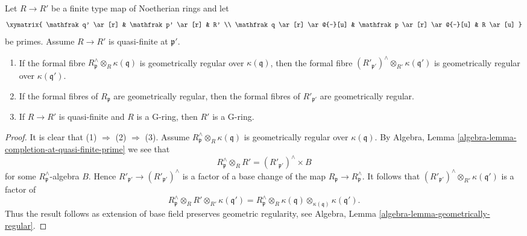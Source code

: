 \begin{lemma}
\label{lemma-G-ring-goes-up-quasi-finite}
Let $R \to R'$ be a finite type map of Noetherian rings and let
$$
\xymatrix{
\mathfrak q' \ar[r] & \mathfrak p' \ar[r] & R' \\
\mathfrak q \ar[r] \ar@{-}[u] &
\mathfrak p \ar[r] \ar@{-}[u] & R \ar[u]
}
$$
be primes. Assume $R \to R'$ is quasi-finite at $\mathfrak p'$.
\begin{enumerate}
\item If the formal fibre $R_\mathfrak p^\wedge \otimes_R \kappa(\mathfrak q)$
is geometrically regular over $\kappa(\mathfrak q)$, then the formal fibre
$(R'_{\mathfrak p'})^\wedge \otimes_{R'} \kappa(\mathfrak q')$
is geometrically regular over $\kappa(\mathfrak q')$.
\item If the formal fibres of $R_\mathfrak p$ are geometrically regular,
then the formal fibres of $R'_{\mathfrak p'}$ are geometrically regular.
\item If $R \to R'$ is quasi-finite and $R$ is a G-ring, then $R'$ is
a G-ring.
\end{enumerate}
\end{lemma}

\begin{proof}
It is clear that (1) $\Rightarrow$ (2) $\Rightarrow$ (3).
Assume $R_\mathfrak p^\wedge \otimes_R \kappa(\mathfrak q)$
is geometrically regular over $\kappa(\mathfrak q)$.
By Algebra, Lemma \ref{algebra-lemma-completion-at-quasi-finite-prime}
we see that
$$
R_\mathfrak p^\wedge \otimes_R R'
=
(R'_{\mathfrak p'})^\wedge \times B
$$
for some $R_\mathfrak p^\wedge$-algebra $B$. Hence
$R'_{\mathfrak p'} \to (R'_{\mathfrak p'})^\wedge$ is a factor of
a base change of the map $R_\mathfrak p \to R_\mathfrak p^\wedge$.
It follows that $(R'_{\mathfrak p'})^\wedge \otimes_{R'} \kappa(\mathfrak q')$
is a factor of
$$
R_\mathfrak p^\wedge \otimes_R R' \otimes_{R'} \kappa(\mathfrak q') =
R_\mathfrak p^\wedge \otimes_R \kappa(\mathfrak q)
\otimes_{\kappa(\mathfrak q)} \kappa(\mathfrak q').
$$
Thus the result follows as extension of base field preserves
geometric regularity, see
Algebra, Lemma \ref{algebra-lemma-geometrically-regular}.
\end{proof}
